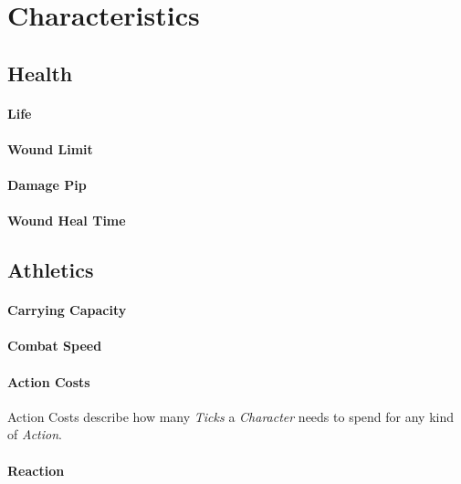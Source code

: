 \section{Characteristics}

\subsection{Health}

\paragraph{Life}

\paragraph{Wound Limit}

\paragraph{Damage Pip}

\paragraph{Wound Heal Time}

\subsection{Athletics}
\paragraph{Carrying Capacity}

\paragraph{Combat Speed}

\paragraph{Action Costs}

Action Costs describe how many \emph{Ticks} a \emph{Character} needs to spend
for any kind of \emph{Action}.

\paragraph{Reaction}

